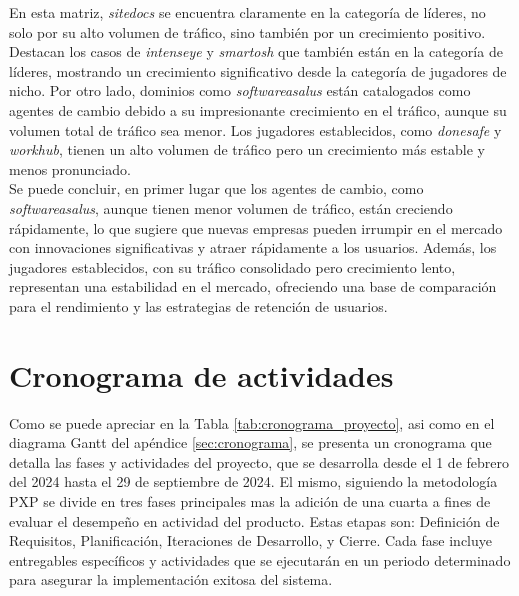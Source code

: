 En esta matriz, \textit{sitedocs} se encuentra claramente en la categoría de líderes, no solo por su alto volumen de tráfico, sino también por un crecimiento positivo. Destacan los casos de \textit{intenseye} y \textit{smartosh} que también están en la categoría de líderes, mostrando un crecimiento significativo desde la categoría de jugadores de nicho. Por otro lado, dominios como \textit{softwareasalus} están catalogados como agentes de cambio debido a su impresionante crecimiento en el tráfico, aunque su volumen total de tráfico sea menor. Los jugadores establecidos, como \textit{donesafe} y \textit{workhub}, tienen un alto volumen de tráfico pero un crecimiento más estable y menos pronunciado.\\ \indent
Se puede concluir, en primer lugar que los agentes de cambio, como \textit{softwareasalus}, aunque tienen menor volumen de tráfico, están creciendo rápidamente, lo que sugiere que nuevas empresas pueden irrumpir en el mercado con innovaciones significativas y atraer rápidamente a los usuarios. Además, los jugadores establecidos, con su tráfico consolidado pero crecimiento lento, representan una estabilidad en el mercado, ofreciendo una base de comparación para el rendimiento y las estrategias de retención de usuarios.

\section{Cronograma de actividades}
Como se puede apreciar en la Tabla \ref{tab:cronograma_proyecto}, asi como en el diagrama Gantt del apéndice \ref{sec:cronograma}, se presenta un cronograma que detalla las fases y actividades del proyecto, que se desarrolla desde el 1 de febrero del 2024 hasta el 29 de septiembre de 2024. El mismo, siguiendo la metodología PXP se divide en tres fases principales mas la adición de una cuarta a fines de evaluar el desempeño en actividad del producto. Estas etapas son: Definición de Requisitos, Planificación, Iteraciones de Desarrollo, y Cierre. Cada fase incluye entregables específicos y actividades que se ejecutarán en un periodo determinado para asegurar la implementación exitosa del sistema.



